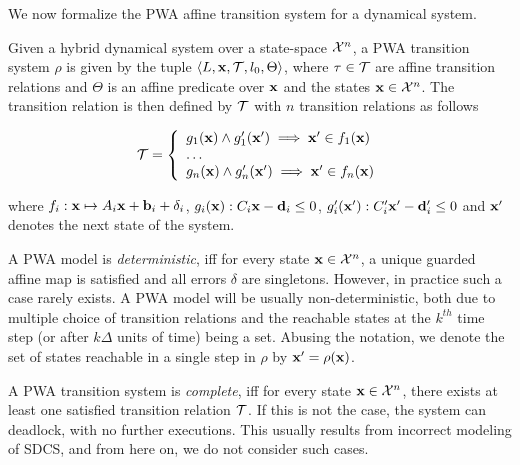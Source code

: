 We now formalize the PWA affine transition system for a dynamical system.
\begin{definition}

Given a hybrid dynamical system over a state-space
$\mathcal{X}^n$, a PWA transition system $\rho$ is given by the
tuple $\left\langle L,\mathbf{x},\mathcal{T},l_0,\Theta \right \rangle$, where $\tau \in
\mathcal{T}$ are affine transition relations and $\Theta$ is an affine
predicate over $\mathbf{x}$ and the states $\mathbf{x}\in\mathcal{X}^n$. The
transition relation is then defined by $\mathcal{T}$ with $n$ transition
relations as follows

\begin{equation}
    \mathcal{T} = \left\{
        \begin{array}{ll}
            g_1(\mathbf{x}) \land g'_1(\mathbf{x}') \implies \mathbf{x}' \in f_1(\mathbf{x}) \\
            \ldots\\
            g_n(\mathbf{x}) \land g'_n(\mathbf{x}') \implies \mathbf{x}' \in f_n(\mathbf{x}) \\
        \end{array}
    \right.
\end{equation}

\end{definition}

where $f_i:\mathbf{x} \mapsto A_i\mathbf{x} + \mathbf{b}_i + \delta_i$,
$g_i(\mathbf{x}):C_i\mathbf{x}-\mathbf{d}_i\le0$, $g'_i(\mathbf{x}'):C'_i\mathbf{x}'-\mathbf{d}'_i\le0$ and $\mathbf{x}'$
denotes the next state of the system.

A PWA model is \textit{deterministic}, iff for every state
$\mathbf{x}\in\mathcal{X}^n$, a unique guarded affine map is satisfied and
all errors $\delta$ are singletons. However, in practice such a case
rarely exists. A PWA model will be usually non-deterministic, both due
to multiple choice of transition relations and the reachable states at
the $k^{th}$ time step (or after $k\Delta$ units of time) being a set.
Abusing the notation, we denote the set of states reachable in a
single step in $\rho$ by $\mathbf{x}' = \rho(\mathbf{x})$.

A PWA transition system is \textit{complete}, iff for every state
$\mathbf{x}\in\mathcal{X}^n$, there exists at least one satisfied
transition relation $\mathcal{T}$. If this is not the case, the system can
deadlock, with no further executions. This usually results from
incorrect modeling of SDCS, and from here on, we do not consider such
cases.


